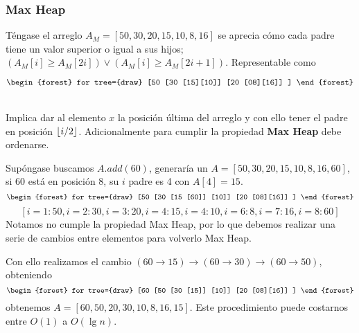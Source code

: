 \subsubsection{Max Heap}
Téngase el arreglo $A_M=[50,30,20,15,10,8,16]$ se aprecia cómo cada padre tiene un valor superior o igual a sus hijos; $(A_M[i] \ge A_M[2i]) \lor (A_M[i] \ge A_M[2i+1])$. Representable como

$$\begin{forest}
		for tree={draw}
		[50
			[30
					[15][10]]
			[20
					[08][16]]
		]
	\end{forest}$$

\begin{theorem}~\\
	Implica dar al elemento $x$ la posición última del arreglo y con ello tener el padre en posición $\left\lfloor i/2 \right\rfloor$.
	Adicionalmente para cumplir la propiedad \textbf{Max Heap} debe ordenarse.

	Supóngase buscamos $A.add(60)$, generaría un $A=[50,30,20,15,10,8,16,60]$, si 60 está en posición 8, su $i$ padre es 4 con $A[4]=15$.
	$$\begin{forest}
			for tree={draw}
			[50
				[30
						[15
								[60]]
						[10]]
				[20
						[08][16]]
			]
		\end{forest}$$
	$$
		[i=1:50,i=2:30,i=3:20,i=4:15,i=4:10,i=6:8,i=7:16,i=8:60]
	$$
	Notamos no cumple la propiedad Max Heap, por lo que debemos realizar una serie de cambios entre elementos para volverlo Max Heap.

	Con ello realizamos el cambio $(60\to15)\to(60\to30)\to(60\to50)$, obteniendo
	$$\begin{forest}
			for tree={draw}
			[60
				[50
						[30
								[15]]
						[10]]
				[20
						[08][16]]
			]
		\end{forest}$$
	obtenemos $A=[60,50,20,30,10,8,16,15]$. Este procedimiento puede costarnos entre $O(1)$ a $O(\lg n)$.
\end{theorem}

